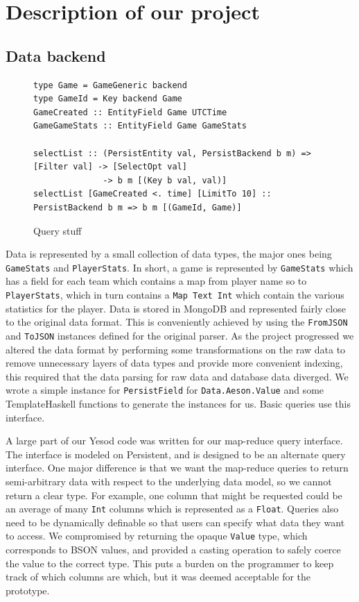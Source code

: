 \documentclass[letterpaper,twocolumn,9pt]{article}
\newcommand{\code}[1]{\texttt{#1}}
\begin{document}
\section{Description of our project}
\label{package}

\subsection{Data backend}

\begin{figure}[t]
\footnotesize{
\begin{verbatim}
type Game = GameGeneric backend
type GameId = Key backend Game
GameCreated :: EntityField Game UTCTime
GameGameStats :: EntityField Game GameStats

selectList :: (PersistEntity val, PersistBackend b m) => [Filter val] -> [SelectOpt val]
              -> b m [(Key b val, val)]
selectList [GameCreated <. time] [LimitTo 10] :: PersistBackend b m => b m [(GameId, Game)]
\end{verbatim}
}
    \caption{Query stuff}
    \label{querycode}
\end{figure}

Data is represented by a small collection of data types, the major ones being \code{GameStats} and \code{PlayerStats}.  In short, a game is represented by \code{GameStats} which has a field for each team which contains a map from player name so to \code{PlayerStats}, which in turn contains a \code{Map Text Int} which contain the various statistics for the player.  Data is stored in MongoDB and represented fairly close to the original data format.  This is conveniently achieved by using the \code{FromJSON} and \code{ToJSON} instances defined for the original parser.  As the project progressed we altered the data format by performing some transformations on the raw data to remove unnecessary layers of data types and provide more convenient indexing, this required that the data parsing for raw data and database data diverged.  We wrote a simple instance for \code{PersistField} for \code{Data.Aeson.Value} and some TemplateHaskell functions to generate the instances for us.  Basic queries use this interface.

A large part of our Yesod code was written for our map-reduce query interface.  The interface is modeled on Persistent, and is designed to be an alternate query interface.  One major difference is that we want the map-reduce queries to return semi-arbitrary data with respect to the underlying data model, so we cannot return a clear type.  For example, one column that might be requested could be an average of many \code{Int} columns which is represented as a \code{Float}.  Queries also need to be dynamically definable so that users can specify what data they want to access.  We compromised by returning the opaque \code{Value} type, which corresponds to BSON values, and provided a casting operation to safely coerce the value to the correct type.  This puts a burden on the programmer to keep track of which columns are which, but it was deemed acceptable for the prototype.
\end{document}
